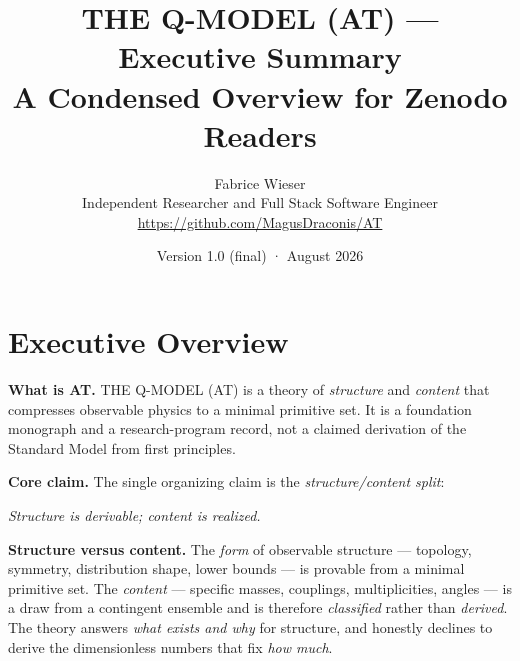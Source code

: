 \documentclass[10pt,a4paper]{article}
\title{\bfseries THE Q-MODEL (AT) — Executive Summary\\[2mm]
\large A Condensed Overview for Zenodo Readers}
\author{Fabrice Wieser\\[1mm]
\small Independent Researcher and Full Stack Software Engineer\\[0.5mm]
\small \url{https://github.com/MagusDraconis/AT}}
\date{Version 1.0 (final) \quad·\quad 15 August 2026}
\begin{document}
\maketitle

\begin{center}
\end{center}

\vspace{2mm}

\section{Executive Overview}

\textbf{What is AT.} THE Q-MODEL (AT) is a theory of \emph{structure} and \emph{content}
that compresses observable physics to a minimal primitive set. It is a foundation
monograph and a research-program record, not a claimed derivation of the Standard Model
from first principles.

\textbf{Core claim.} The single organizing claim is the \emph{structure/content split}:

\begin{center}
\emph{Structure is derivable; content is realized.}
\end{center}

\textbf{Structure versus content.} The \emph{form} of observable structure --- topology,
symmetry, distribution shape, lower bounds --- is provable from a minimal primitive set.
The \emph{content} --- specific masses, couplings, multiplicities, angles --- is a draw
from a contingent ensemble and is therefore \emph{classified} rather than \emph{derived}.
The theory answers \emph{what exists and why} for structure, and honestly declines to
derive the dimensionless numbers that fix \emph{how much}.
\end{document}
